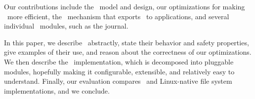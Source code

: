Our contributions include the \patch\ model and design, our
 optimizations for making \patches\ more efficient,
 the \patchgroup\ mechanism that exports
 \patches\ to applications, and several individual \Kudos\ modules, such as
 the journal.


In this paper, we describe \patches\ abstractly, state their behavior and safety
 properties, give examples of their use, and reason about the
 correctness of our optimizations.
%
We then describe the \Kudos\ implementation, which is decomposed
 into pluggable modules, hopefully making it configurable,
 extensible, and relatively easy to understand.
%
Finally, our evaluation compares \Kudos\ and Linux-native file
 system implementations, and we conclude.




\begin{comment}
%
Our benchmarks show that our optimizations can reduce the number of
 \patches\ \Kudos\ creates by \patchoptcount\ and the amount of undo data
 memory it allocates by \patchoptundo.
%
Our prototype is not yet as fast as we would like, but it is competitive
 with Linux on many of our benchmarks.
\end{comment}

